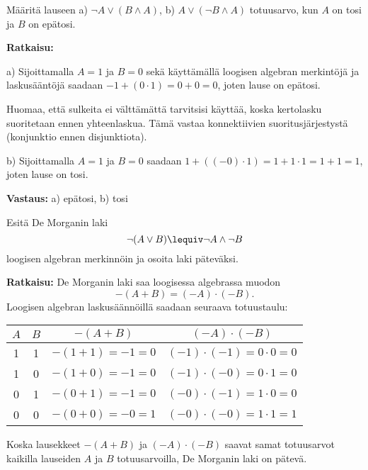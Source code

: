 \begin{esimerkki}
Määritä lauseen
 a) $\lnot A \lor (B\land A)$,  b) $A\lor (\lnot B \land A)$  
totuusarvo, kun $A$ on tosi ja $B$ on epätosi.

{\bf Ratkaisu:}

a) Sijoittamalla $A=1$ ja $B=0$ sekä käyttämällä loogisen algebran merkintöjä ja laskusääntöjä saadaan $-1+(0\cdot 1) = 0 + 0 =  0$, joten lause on epätosi.

Huomaa, että sulkeita ei välttämättä tarvitsisi käyttää, koska kertolasku suoritetaan ennen yhteenlaskua. Tämä vastaa konnektiivien suoritusjärjestystä (konjunktio ennen disjunktiota).

b) Sijoittamalla $A=1$ ja $B=0$ saadaan $1 + ((- 0)\cdot1) = 1 + 1\cdot1 = 1 + 1 = 1$, joten lause on tosi.

{\bf Vastaus:} a) epätosi, b) tosi
\end{esimerkki}

\begin{esimerkki}
Esitä De Morganin laki
\[
\lnot (A\lor B) \lequiv \lnot A\land \lnot B
\]
loogisen algebran merkinnöin ja osoita laki päteväksi.

{\bf Ratkaisu:}
De Morganin laki saa loogisessa algebrassa muodon
\[
- (A + B) =( - A )\cdot( - B ).
\]
Loogisen algebran laskusäännöillä saadaan seuraava totuustaulu:

\begin{tabular}{|c|c|c|c|}
\hline
$A$ & $B$ & $- (A + B)$ & $( - A )\cdot( - B )$\\ \hline
1 & 1 & $- (1 + 1) = - 1 = 0$ & $( - 1 )\cdot ( - 1 ) = 0\cdot 0
= 0$\\ \hline
1 & 0 & $- (1 + 0) = - 1 = 0$ & $( - 1 )\cdot ( - 0 ) = 0\cdot 1
= 0$\\ \hline
0 & 1 & $- (0 + 1) = - 1 = 0$ & $( - 0 )\cdot( - 1 ) = 1\cdot 0 =
0$\\ \hline
0 & 0 & $- (0 + 0) = - 0 = 1$ & $( - 0 )\cdot( - 0 ) = 1\cdot 1 =
1$\\ \hline
\end{tabular}

Koska lausekkeet $- (A + B)$ ja $( - A ) \cdot ( - B )$ saavat
samat totuusarvot kaikilla lauseiden $A$ ja $B$ totuusarvoilla,
De Morganin laki on pätevä.
\end{esimerkki}



